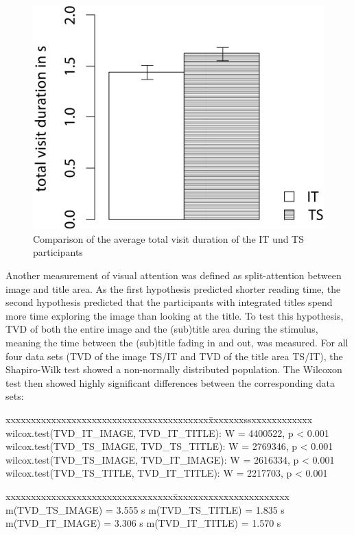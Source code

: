 \documentclass[output=paper]{langsci/langscibook}
\begin{document}
\begin{figure} 
  \includegraphics[height=.3\textheight]{figures/Fox6_neu.jpg}
  \caption{Comparison of the average total visit duration of the IT und TS participants}
  \label{fox:fig:6}
\end{figure}


Another measurement of visual attention was defined as split-attention between image and title area. As the first hypothesis predicted shorter reading time, the second hypothesis predicted that the participants with integrated titles spend more time exploring the image than looking at the title. To test this hypothesis, TVD of both the entire image and the (sub)title area during the stimulus, meaning the time between the (sub)title fading in and out, was measured. For all four data sets (TVD of the image TS/IT and TVD of the title area TS/IT), the Shapiro-Wilk test showed a non-normally distributed population. The Wilcoxon test then showed highly significant differences between the corresponding data sets:


\ea
\begin{tabbing}
xxxxxxxxxxxxxxxxxxxxxxxxxxxxxxxxxxxxxxxx\=xxxxxxxssxxxxxxxxxxxx\kill
wilcox.test(TVD\_IT\_IMAGE, TVD\_IT\_TITLE): \>		W = 4400522, p < 0.001\\
wilcox.test(TVD\_TS\_IMAGE, TVD\_TS\_TITLE): \>		W = 2769346, p < 0.001\\
wilcox.test(TVD\_TS\_IMAGE, TVD\_IT\_IMAGE): \>		W = 2616334, p < 0.001\\
wilcox.test(TVD\_TS\_TITLE, TVD\_IT\_TITLE): \>		W = 2217703, p < 0.001
\end{tabbing}
\begin{tabbing}
xxxxxxxxxxxxxxxxxxxxxxxxxxxxxxxxx\=xxxxxxxxxxxxxxxxxxxxxxx\kill
m(TVD\_TS\_IMAGE) = 3.555 s	\>	m(TVD\_TS\_TITLE) = 1.835 s\\
m(TVD\_IT\_IMAGE) = 3.306 s	\>	m(TVD\_IT\_TITLE) = 1.570 s
\end{tabbing}
\z
\end{document}
